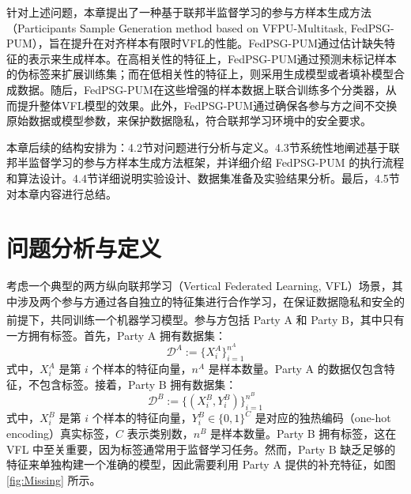 针对上述问题，本章提出了一种基于联邦半监督学习的参与方样本生成方法（Participants Sample Generation method based on VFPU-Multitask, FedPSG-PUM），旨在提升在对齐样本有限时VFL的性能。FedPSG-PUM通过估计缺失特征的表示来生成样本。在高相关性的特征上，FedPSG-PUM通过预测未标记样本的伪标签来扩展训练集；而在低相关性的特征上，则采用生成模型或者填补模型合成数据。随后，FedPSG-PUM在这些增强的样本数据上联合训练多个分类器，从而提升整体VFL模型的效果。此外，FedPSG-PUM通过确保各参与方之间不交换原始数据或模型参数，来保护数据隐私，符合联邦学习环境中的安全要求。

本章后续的结构安排为：4.2节对问题进行分析与定义。4.3节系统性地阐述基于联邦半监督学习的参与方样本生成方法框架，并详细介绍  FedPSG-PUM  的执行流程和算法设计。4.4节详细说明实验设计、数据集准备及实验结果分析。最后，4.5节对本章内容进行总结。

\section{问题分析与定义}
考虑一个典型的两方纵向联邦学习（Vertical Federated Learning, VFL）场景，其中涉及两个参与方通过各自独立的特征集进行合作学习，在保证数据隐私和安全的前提下，共同训练一个机器学习模型\textsuperscript{\cite{yang2019federated}}。参与方包括 Party A 和 Party B，其中只有一方拥有标签。首先，Party A 拥有数据集：
\begin{equation}
	\mathcal{D}^A := \{X^A_i\}_{i=1}^{n^A}
\end{equation}
式中，$X^A_i$ 是第 $i$ 个样本的特征向量，$n^A$ 是样本数量。Party A 的数据仅包含特征，不包含标签。接着，Party B 拥有数据集：
\begin{equation}
	\mathcal{D}^B := \{(X^B_i, Y^B_i)\}_{i=1}^{n^B}
\end{equation}
式中，$X^B_i$ 是第 $i$ 个样本的特征向量，$Y^B_i \in \{0,1\}^C$ 是对应的独热编码（one-hot encoding）真实标签，$C$ 表示类别数，$n^B$ 是样本数量。Party B 拥有标签，这在 VFL 中至关重要，因为标签通常用于监督学习任务。然而，Party B 缺乏足够的特征来单独构建一个准确的模型，因此需要利用 Party A 提供的补充特征，如图 \ref{fig:Missing} 所示。

